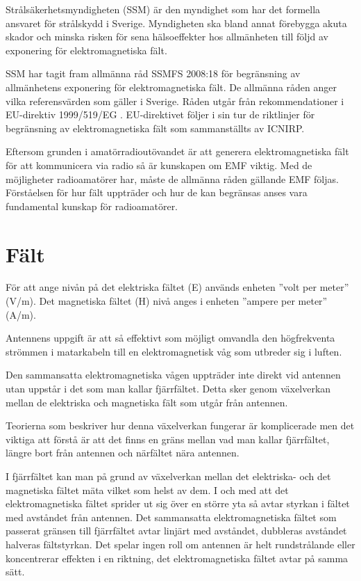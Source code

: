 Strålsäkerhetsmyndigheten (SSM) är den myndighet som har det formella ansvaret
för strålskydd i Sverige.
Myndigheten ska bland annat förebygga akuta skador och minska risken för sena
hälsoeffekter hos allmänheten till följd av exponering för elektromagnetiska
fält.

SSM har tagit fram allmänna råd SSMFS 2008:18 \cite{SSMFS2008:18} för
begränsning av allmänhetens exponering för elektromagnetiska fält.
De allmänna råden anger vilka referensvärden som gäller i Sverige.
Råden utgår från rekommendationer i EU-direktiv 1999/519/EG \cite{1999/519/EG}.
EU-direktivet följer i sin tur de riktlinjer för begränsning av
elektromagnetiska fält som sammanställts av ICNIRP.

Eftersom grunden i amatörradioutövandet är att generera elektromagnetiska fält
för att kommunicera via radio så är kunskapen om EMF viktig.
Med de möjligheter radioamatörer har, måste de allmänna råden gällande EMF
följas.
Förståelsen för hur fält uppträder och hur de kan begränsas anses vara
fundamental kunskap för radioamatörer.

\section{Fält}
För att ange nivån på det elektriska fältet (E) används enheten
''volt per meter'' (V/m).
Det magnetiska fältet (H) nivå anges i enheten ''ampere per meter'' (A/m).

Antennens uppgift är att så effektivt som möjligt omvandla den högfrekventa
strömmen i matarkabeln till en elektromagnetisk våg som utbreder sig i luften.

Den sammansatta elektromagnetiska vågen uppträder inte direkt vid antennen utan
uppstår i det som man kallar fjärrfältet.
Detta sker genom växelverkan mellan de elektriska och magnetiska fält som
utgår från antennen.

Teorierna som beskriver hur denna växelverkan fungerar är komplicerade
men det viktiga att förstå är att det finns en gräns mellan vad man
kallar fjärrfältet, längre bort från antennen och närfältet nära antennen.

I fjärrfältet kan man på grund av växelverkan mellan det elektriska- och det
magnetiska fältet mäta vilket som helst av dem.
I och med att det elektromagnetiska fältet sprider ut sig över en större yta så
avtar styrkan i fältet med avståndet från antennen.
Det sammansatta elektromagnetiska fältet som passerat gränsen till fjärrfältet
avtar linjärt med avståndet, dubbleras avståndet halveras fältstyrkan.
Det spelar ingen roll om antennen är helt rundstrålande eller koncentrerar
effekten i en riktning, det elektromagnetiska fältet avtar på samma sätt.

